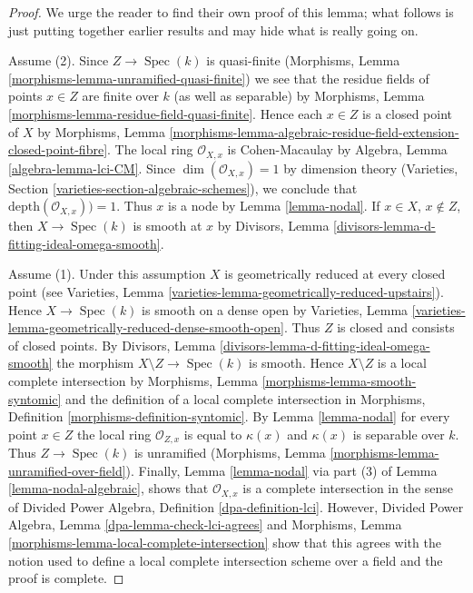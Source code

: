 \documentclass[10pt,a4paper]{amsart}
\theoremstyle{plain}
\theoremstyle{definition}
\theoremstyle{remark}
\numberwithin{equation}{subsection}
\def\Spec{\mathop{\mathrm{Spec}}}
\begin{document}
\begin{proof}
We urge the reader to find their own proof of
this lemma; what follows is just putting together earlier results
and may hide what is really going on.

\medskip\noindent
Assume (2). Since $Z \to \Spec(k)$ is quasi-finite
(Morphisms, Lemma \ref{morphisms-lemma-unramified-quasi-finite})
we see that the residue fields of points $x \in Z$ are finite
over $k$ (as well as separable) by
Morphisms, Lemma \ref{morphisms-lemma-residue-field-quasi-finite}.
Hence each $x \in Z$ is a closed point of $X$ by
Morphisms, Lemma
\ref{morphisms-lemma-algebraic-residue-field-extension-closed-point-fibre}.
The local ring $\mathcal{O}_{X, x}$ is Cohen-Macaulay by
Algebra, Lemma \ref{algebra-lemma-lci-CM}.
Since $\dim(\mathcal{O}_{X, x}) = 1$ by dimension theory
(Varieties, Section \ref{varieties-section-algebraic-schemes}), we conclude
that $\text{depth}(\mathcal{O}_{X, x})) = 1$. Thus $x$ is a node
by Lemma \ref{lemma-nodal}. If $x \in X$, $x \not \in Z$, then
$X \to \Spec(k)$ is smooth at $x$ by
Divisors, Lemma \ref{divisors-lemma-d-fitting-ideal-omega-smooth}.

\medskip\noindent
Assume (1). Under this assumption $X$ is geometrically reduced
at every closed point (see
Varieties, Lemma \ref{varieties-lemma-geometrically-reduced-upstairs}).
Hence $X \to \Spec(k)$ is smooth on a dense open by
Varieties, Lemma \ref{varieties-lemma-geometrically-reduced-dense-smooth-open}.
Thus $Z$ is closed and consists of closed points.
By Divisors, Lemma \ref{divisors-lemma-d-fitting-ideal-omega-smooth}
the morphism $X \setminus Z \to \Spec(k)$ is smooth.
Hence $X \setminus Z$ is a local complete intersection by
Morphisms, Lemma \ref{morphisms-lemma-smooth-syntomic}
and the definition of a local complete intersection in
Morphisms, Definition \ref{morphisms-definition-syntomic}.
By Lemma \ref{lemma-nodal} for every point $x \in Z$
the local ring $\mathcal{O}_{Z, x}$ is equal to $\kappa(x)$
and $\kappa(x)$ is separable over $k$. Thus $Z \to \Spec(k)$
is unramified (Morphisms, Lemma \ref{morphisms-lemma-unramified-over-field}).
Finally, Lemma \ref{lemma-nodal} via part (3) of
Lemma \ref{lemma-nodal-algebraic}, shows that $\mathcal{O}_{X, x}$
is a complete intersection in the sense of
Divided Power Algebra, Definition \ref{dpa-definition-lci}.
However, Divided Power Algebra, Lemma \ref{dpa-lemma-check-lci-agrees}
and Morphisms, Lemma \ref{morphisms-lemma-local-complete-intersection}
show that this agrees with the notion used to define a local
complete intersection scheme over a field and the proof is complete.
\end{proof}
\end{document}
